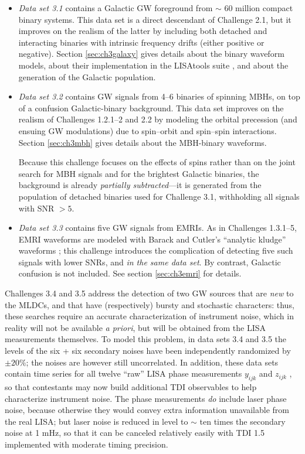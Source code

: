 \documentclass{iopart}
\begin{document}
%
\begin{itemize}
%
\item \textit{Data set 3.1} contains a Galactic GW foreground from $\sim$ 60 million compact binary systems.
This data set is a direct descendant of Challenge 2.1, but it improves on the realism of the latter by including both detached and interacting binaries with intrinsic frequency drifts (either positive or negative). Section \ref{sec:ch3galaxy} gives details about the binary waveform models, about their implementation in the LISAtools suite \cite{lisatools}, and about the generation of the Galactic population. 
%
\item \textit{Data set 3.2} contains GW signals from 4--6 binaries of spinning MBHs, on top of a confusion Galactic-binary background. This data set improves on the realism of Challenges 1.2.1--2 and 2.2 by modeling the orbital precession (and ensuing GW modulations) due to spin--orbit and spin--spin interactions. Section \ref{sec:ch3mbh} gives details about the MBH-binary waveforms.

Because this challenge focuses on the effects of spins rather than on the joint search for MBH signals and for the brightest Galactic binaries, the background is already \emph{partially subtracted}---it is generated from the population of detached binaries used for Challenge 3.1, withholding all signals with SNR $> 5$.
%
\item \textit{Data set 3.3} contains five GW signals from EMRIs. As in Challenges 1.3.1--5, EMRI waveforms are modeled with Barack and Cutler's ``analytic kludge'' waveforms \cite{barackcutler}; this challenge introduces the complication of detecting five such signals with lower SNRs, and \emph{in the same data set}. By contrast, Galactic confusion is not included. See section \ref{sec:ch3emri} for details.
%
\end{itemize}
%
Challenges 3.4 and 3.5 address the detection of two GW sources that are \emph{new} to the MLDCs, and that have (respectively) bursty and stochastic characters: thus, these searches require an accurate characterization of instrument noise, which in reality will not be available \emph{a priori}, but will be obtained from the LISA measurements themselves.
To model this problem, in data sets 3.4 and 3.5 the levels of the six + six secondary noises have been independently randomized by $\pm 20 \%$; the noises are however still uncorrelated. In addition, these data sets contain time series for all twelve ``raw'' LISA phase measurements $y_{ijk}$ and $z_{ijk}$ \cite{synthlisa}, so that contestants may now build additional TDI observables to help characterize instrument noise. The phase measurements \emph{do} include laser phase noise, because otherwise they would convey extra information unavailable from the real LISA; but laser noise is reduced in level to $\sim$ ten times the secondary noise at 1 mHz, so that it can be canceled relatively easily with TDI 1.5 implemented with moderate timing precision.
\end{document}
